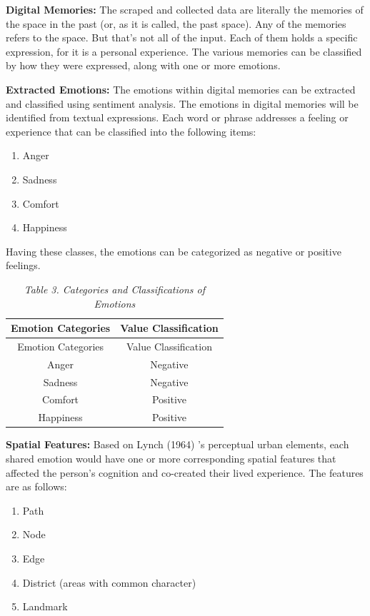 \documentclass[
  letterpaper,
  DIV=11,
  numbers=noendperiod]{scrartcl}
\providecommand{\tightlist}{%
  \setlength{\itemsep}{0pt}\setlength{\parskip}{0pt}}
\begin{document}
\textbf{Digital Memories:} The scraped and collected data are literally
the memories of the space in the past (or, as it is called, the past
space). Any of the memories refers to the space. But that's not all of
the input. Each of them holds a specific expression, for it is a
personal experience. The various memories can be classified by how they
were expressed, along with one or more emotions.

\textbf{Extracted Emotions:} The emotions within digital memories can be
extracted and classified using sentiment analysis. The emotions in
digital memories will be identified from textual expressions. Each word
or phrase addresses a feeling or experience that can be classified into
the following items:

\begin{enumerate}
\def\labelenumi{\arabic{enumi}.}
\item
  Anger
\item
  Sadness
\item
  Comfort
\item
  Happiness
\end{enumerate}

Having these classes, the emotions can be categorized as negative or
positive feelings.

\begin{longtable}[]{@{}cc@{}}
\caption{\emph{Table 3. Categories and Classifications of
Emotions}}\tabularnewline
\toprule\noalign{}
Emotion Categories & Value Classification \\
\midrule\noalign{}
\endfirsthead
\toprule\noalign{}
Emotion Categories & Value Classification \\
\midrule\noalign{}
\endhead
\bottomrule\noalign{}
\endlastfoot
Anger & Negative \\
Sadness & Negative \\
Comfort & Positive \\
Happiness & Positive \\
\end{longtable}

\textbf{Spatial Features:} Based on Lynch (1964) 's perceptual urban
elements, each shared emotion would have one or more corresponding
spatial features that affected the person's cognition and co-created
their lived experience. The features are as follows:

\begin{enumerate}
\def\labelenumi{\arabic{enumi}.}
\tightlist
\item
  Path
\item
  Node
\item
  Edge
\item
  District (areas with common character)
\item
  Landmark
\end{enumerate}
\end{document}
